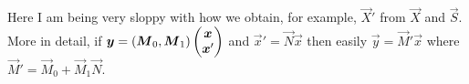 \documentclass[runningheads,11pt]{llncs}
\begin{document}
Here I am being very sloppy with how we obtain, for example, $\vec X'$ from $\vec X$ and
$\vec S$.
More in detail, if 
$\vec y = (\vec M_0, \vec M_1) \pmtrx{\vec x\\\vec x'}$ and $\vec x' = \vec N \vec x$ then
easily $\vec y = \vec M' \vec x$ where $\vec M' = \vec M_0 + \vec M_1\vec N$.







\end{document}
